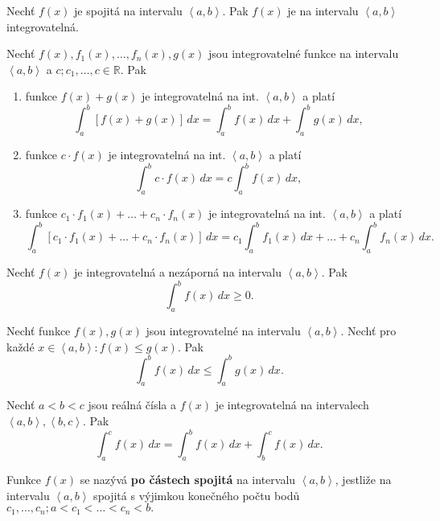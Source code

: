 \begin{veta}
Nechť $f(x)$ je spojitá na intervalu $\left < a,b \right > $. Pak $f(x)$ je na
intervalu $\left < a,b \right > $ integrovatelná.
\end{veta}

\begin{veta}
Nechť $f(x), f_1(x),\dots,f_n(x), g(x)$ jsou integrovatelné funkce na intervalu $\left < a,b \right > $
a $c; c_1,\dots,c\in \mathbb R.$ Pak
\begin{enumerate}[$i.$]
\item funkce $f(x)+g(x)$ je integrovatelná na int. $\left < a,b \right > $ a platí
$$\int _a^b \left [ f(x)+g(x) \right ] \, dx = \int_a ^b f(x)\, dx + \int_a ^b g(x) \, dx,$$
\item funkce $c\cdot f(x)$ je integrovatelná na int. $\left < a,b \right > $ a platí
$$\int _a ^b c\cdot f(x) \, dx = c \int _a ^b f(x)\, dx,$$
\item funkce $c_1\cdot f_1(x) + \dots + c_n \cdot f_n(x)$ je integrovatelná na int. $\left < a,b \right > $ a platí
$$\int_a ^b \left [ c_1\cdot f_1(x) + \dots + c_n \cdot f_n (x) \right ]\, dx = c_1 \int _a ^b f_1(x)\, dx + \dots + c_n \int _a ^b f_n(x)\, dx. $$
\end{enumerate}
\end{veta}

\begin{veta}
Nechť $f(x)$ je integrovatelná a nezáporná na intervalu $\left < a,b \right > $. Pak
$$\int_a ^b f(x) \, dx \geq 0.$$
\end{veta}

\begin{veta}
Nechť funkce $f(x),g(x)$ jsou integrovatelné na intervalu $\left < a,b \right > .$
Nechť pro každé $x\in \left < a,b \right > :f(x)\leq g(x).$ Pak
$$\int_a^b f(x) \, dx \leq \int_a^b g(x) \, dx.$$
\end{veta}

\begin{veta}
Nechť $a<b<c$ jsou reálná čísla a $f(x)$ je integrovatelná na intervalech
$\left < a,b \right >, \left < b,c \right > . $ Pak
$$\int_a^c f(x)\, dx = \int_a^b f(x)\, dx + \int_b^c f(x)\, dx.$$
\end{veta}

\begin{definition}\label{pocastechspoj}
Funkce $f(x)$ se nazývá \textbf{po částech spojitá} na intervalu $\left < a,b \right > $,
jestliže na intervalu $\left < a,b \right > $ spojitá s výjimkou konečného počtu
bodů $c_1,\dots,c_n; a<c_1<\dots<c_n<b.$
\end{definition}

